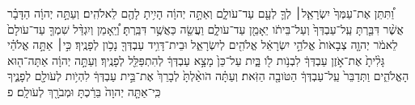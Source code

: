 \documentclass{openreader}
\begin{document}
וַ֠תִּתֵּן אֶת־עַמְּךָ֙ יִשְׂרָאֵ֧ל׀ לְךָ֛ לְעָ֖ם עַד־עֹולָ֑ם וְאַתָּ֣ה יְהוָ֔ה הָיִ֥יתָ לָהֶ֖ם לֵאלֹהִֽים׃ 
וְעַתָּ֣ה יְהוָ֔ה הַדָּבָ֗ר אֲשֶׁ֨ר דִּבַּ֤רְתָּ עַֽל־עַבְדְּךָ֙ וְעַל־בֵּיתֹ֔ו יֵאָמֵ֖ן עַד־עֹולָ֑ם וַעֲשֵׂ֖ה כַּאֲשֶׁ֥ר דִּבַּֽרְתָּ׃ 
וְ֠יֵֽאָמֵן וְיִגְדַּ֨ל שִׁמְךָ֤ עַד־עֹולָם֙ לֵאמֹ֔ר יְהוָ֤ה צְבָאֹות֙ אֱלֹהֵ֣י יִשְׂרָאֵ֔ל אֱלֹהִ֖ים לְיִשְׂרָאֵ֑ל וּבֵית־דָּוִ֥יד עַבְדְּךָ֖ נָכֹ֥ון לְפָנֶֽיךָ׃ 
כִּ֣י׀ אַתָּ֣ה אֱלֹהַ֗י גָּלִ֨יתָ֙ אֶת־אֹ֣זֶן עַבְדְּךָ֔ לִבְנֹ֥ות לֹ֖ו בָּ֑יִת עַל־כֵּן֙ מָצָ֣א עַבְדְּךָ֔ לְהִתְפַּלֵּ֖ל לְפָנֶֽיךָ׃ 
וְעַתָּ֣ה יְהוָ֔ה אַתָּה־ה֖וּא הָאֱלֹהִ֑ים וַתְּדַבֵּר֙ עַֽל־עַבְדְּךָ֔ הַטֹּובָ֖ה הַזֹּֽאת׃ 
וְעַתָּ֗ה הֹואַ֨לְתָּ֙ לְבָרֵךְ֙ אֶת־בֵּ֣ית עַבְדְּךָ֔ לִהְיֹ֥ות לְעֹולָ֖ם לְפָנֶ֑יךָ כִּֽי־אַתָּ֤ה יְהוָה֙ בֵּרַ֔כְתָּ וּמְבֹרָ֖ךְ לְעֹולָֽם׃ פ 
\end{document}
